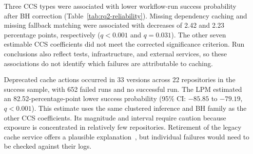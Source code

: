 \documentclass[smallextended]{svjour3}
\begin{document}
Three CCS types were associated with lower workflow-run success probability after BH correction (Table~\ref{tab:rq2-reliability}). Missing dependency caching and missing fallback matching were associated with decreases of 2.42 and 2.23 percentage points, respectively ($q<0.001$ and $q=0.031$). The other seven estimable CCS coefficients did not meet the corrected significance criterion. Run conclusions also reflect tests, infrastructure, and external services, so these associations do not identify which failures are attributable to caching.

Deprecated cache actions occurred in 33 versions across 22 repositories in the success sample, with 652 failed runs and no successful run. The LPM estimated an 82.52-percentage-point lower success probability (95\% CI: $-85.85$ to $-79.19$, $q<0.001$). This estimate uses the same clustered inference and BH family as the other CCS coefficients. Its magnitude and interval require caution because exposure is concentrated in relatively few repositories. Retirement of the legacy cache service offers a plausible explanation~\citep{gha_cache_action}, but individual failures would need to be checked against their logs.
\end{document}

